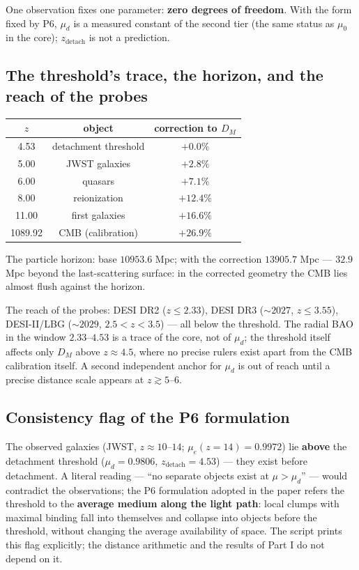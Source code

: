 \documentclass[a4paper,10pt]{article}
\begin{document}
One observation fixes one parameter: \textbf{zero degrees of freedom}. With the form fixed by P6, $\mu_d$ is a measured constant of the second tier (the same status as $\mu_0$ in the core); $z_{\text{detach}}$ is not a prediction.

\subsection{The threshold's trace, the horizon, and the reach of the probes}

\begin{table}[htbp]
\centering
\small
\begin{tabular}{@{}ccc@{}}
\toprule
$z$ & object & correction to $D_M$ \\
\midrule
4.53 & detachment threshold & $+0.0\%$ \\
5.00 & JWST galaxies & $+2.8\%$ \\
6.00 & quasars & $+7.1\%$ \\
8.00 & reionization & $+12.4\%$ \\
11.00 & first galaxies & $+16.6\%$ \\
1089.92 & CMB (calibration) & $+26.9\%$ \\
\bottomrule
\end{tabular}
\end{table}

The particle horizon: base $10953.6$ Mpc; with the correction $13905.7$ Mpc --- $32.9$ Mpc beyond the last-scattering surface: in the corrected geometry the CMB lies almost flush against the horizon.

The reach of the probes: DESI DR2 ($z \le 2.33$), DESI DR3 (${\sim}2027$, $z \le 3.55$), DESI-II/LBG (${\sim}2029$, $2.5 < z < 3.5$) --- all below the threshold. The radial BAO in the window $2.33\text{--}4.53$ is a trace of the core, not of $\mu_d$; the threshold itself affects only $D_M$ above $z \approx 4.5$, where no precise rulers exist apart from the CMB calibration itself. A second independent anchor for $\mu_d$ is out of reach until a precise distance scale appears at $z \gtrsim 5\text{--}6$.

\subsection{Consistency flag of the P6 formulation}

The observed galaxies (JWST, $z \approx 10\text{--}14$; $\mu_e(z{=}14) = 0.9972$) lie \textbf{above} the detachment threshold ($\mu_d = 0.9806$, $z_{\text{detach}} = 4.53$) --- they exist before detachment. A literal reading --- ``no separate objects exist at $\mu > \mu_d$'' --- would contradict the observations; the P6 formulation adopted in the paper refers the threshold to the \textbf{average medium along the light path}: local clumps with maximal binding fall into themselves and collapse into objects before the threshold, without changing the average availability of space. The script prints this flag explicitly; the distance arithmetic and the results of Part I do not depend on it.
\end{document}
